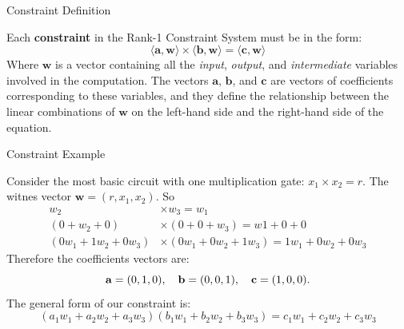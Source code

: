 \documentclass{beamer}
\begin{document}
    \begin{frame}{Constraint Definition}
        \begin{definition}
            Each \textbf{constraint} in the Rank-1 Constraint System must be in the form:
            \begin{equation*}
                \langle \mathbf{a}, \mathbf{w}\rangle \times \langle \mathbf{b}, \mathbf{w}\rangle = \langle \mathbf{c}, \mathbf{w}\rangle
            \end{equation*}
            Where $\mathbf{w}$ is a vector containing all the \textit{input}, \textit{output}, and 
            \textit{intermediate} variables involved in the computation. The vectors $\mathbf{a}$, 
            $\mathbf{b}$, and $\mathbf{c}$ are vectors of coefficients corresponding to these variables, 
            and they define the relationship between the linear combinations of $\mathbf{w}$ on the 
            left-hand side and the right-hand side of the equation.
        \end{definition}        
    \end{frame}

    \begin{frame}{Constraint Example}
        \begin{example}
            Consider the most basic circuit with one multiplication gate: $x_1 \times x_2 = r$.
            The witnes vector $\mathbf{w} = (r, x_1, x_2)$. So
            \vspace{-5pt}
            \begin{align*}
                w_2 &\times w_3 = w_1 \\
                (0 + w_2 + 0) &\times (0 + 0 + w_3) = w1 + 0 + 0 \\
                (0w_1 + 1w_2 + 0w_3) &\times (0w_1 + 0w_2 + 1w_3) = 1w_1 + 0w_2 + 0w_3
            \end{align*}
            Therefore the coefficients vectors are:
            \vspace{-5pt}
            \begin{equation*}
                \mathbf{a} = (0, 1, 0), \quad \mathbf{b} = (0, 0, 1), \quad \mathbf{c} = (1, 0, 0). 
                \vspace{-5pt}
            \end{equation*}
            The general form of our constraint is:
            \vspace{-5pt}
            \begin{equation*}
                (a_1w_1 + a_2w_2 + a_3w_3)(b_1w_1 + b_2w_2 + b_3w_3) = c_1w_1 + c_2w_2 + c_3w_3
            \end{equation*}
        \end{example}
    \end{frame}
\end{document}
